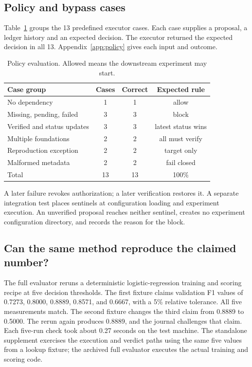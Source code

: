 \documentclass{article}
\begin{document}
\subsection{Policy and bypass cases}

Table~\ref{tab:policy} groups the 13 predefined executor cases. Each case supplies a proposal, a ledger history and an expected decision. The executor returned the expected decision in all 13. Appendix~\ref{app:policy} gives each input and outcome.

\begin{table}[t]
  \caption{Policy evaluation. Allowed means the downstream experiment may start.}
  \label{tab:policy}
  \centering
  \small
  \begin{tabular}{lccc}
    \toprule
    Case group & Cases & Correct & Expected rule \\
    \midrule
    No dependency & 1 & 1 & allow \\
    Missing, pending, failed & 3 & 3 & block \\
    Verified and status updates & 3 & 3 & latest status wins \\
    Multiple foundations & 2 & 2 & all must verify \\
    Reproduction exception & 2 & 2 & target only \\
    Malformed metadata & 2 & 2 & fail closed \\
    \midrule
    Total & 13 & 13 & 100\% \\
    \bottomrule
  \end{tabular}
\end{table}

A later failure revokes authorization; a later verification restores it. A separate integration test places sentinels at configuration loading and experiment execution. An unverified proposal reaches neither sentinel, creates no experiment configuration directory, and records the reason for the block.

\subsection{Can the same method reproduce the claimed number?}

The full evaluator reruns a deterministic logistic-regression training and scoring recipe at five decision thresholds. The first fixture claims validation F1 values of 0.7273, 0.8000, 0.8889, 0.8571, and 0.6667, with a 5\% relative tolerance. All five measurements match. The second fixture changes the third claim from 0.8889 to 0.5000. The rerun again produces 0.8889, and the journal challenges that claim. Each five-run check took about 0.27 seconds on the test machine. The standalone supplement exercises the execution and verdict paths using the same five values from a lookup fixture; the archived full evaluator executes the actual training and scoring code.
\end{document}
